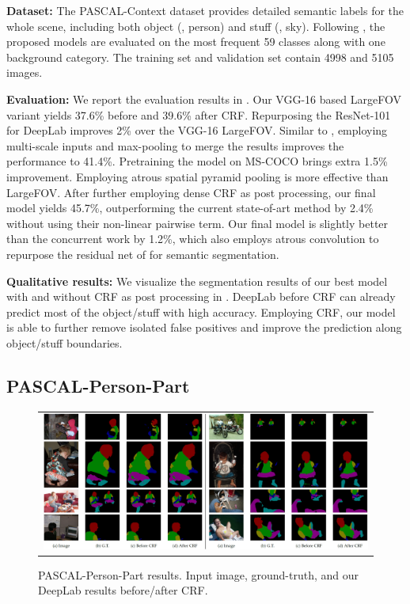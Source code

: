 \textbf{Dataset:} The PASCAL-Context dataset \cite{mottaghi2014role} provides
detailed semantic labels for the whole scene, including both object (\eg, person)
and stuff (\eg, sky). Following \cite{mottaghi2014role}, the proposed models are
evaluated on the most frequent 59 classes along with one background category.
The training set and validation set contain 4998 and 5105 images.

\textbf{Evaluation:} We report the evaluation results in .
Our VGG-16 based LargeFOV variant yields 37.6\% before and 39.6\% after CRF.
Repurposing the ResNet-101 \cite{he2015deep} for DeepLab improves 2\% over the
VGG-16 LargeFOV. Similar to \cite{chen2015attention}, employing multi-scale inputs
and max-pooling to merge the results improves the performance to 41.4\%.
Pretraining the model on MS-COCO brings extra 1.5\% improvement.
Employing atrous spatial pyramid pooling is more effective than LargeFOV.
After further employing dense CRF as post processing, our final model
yields 45.7\%, outperforming the current state-of-art method
\cite{lin2015efficient} by 2.4\% without using their non-linear pairwise term. Our final
model is slightly better than the concurrent work \cite{wu2016bridging} by 1.2\%, which also employs
atrous convolution to repurpose the residual net of \cite{he2015deep} for semantic segmentation.

\textbf{Qualitative results:} We visualize the segmentation results of our best
model with and without CRF as post processing in
. DeepLab before CRF can already predict
most of the object/stuff with high accuracy. Employing CRF, our model is able to
further remove isolated false positives and improve the prediction along
object/stuff boundaries.

\subsection{PASCAL-Person-Part}
\label{exp:pascal_person_part}

\begin{figure}[!th]
  \centering
  \scalebox{0.9} {
  \begin{tabular}{c}
    \includegraphics[width=1.\linewidth]{fig/voc10_part/results.jpg} \\
  \end{tabular}
  }
  \caption{PASCAL-Person-Part results. Input image, ground-truth,
    and our DeepLab results before/after CRF.}
  \label{fig:voc10_part_val_results}
\end{figure}

